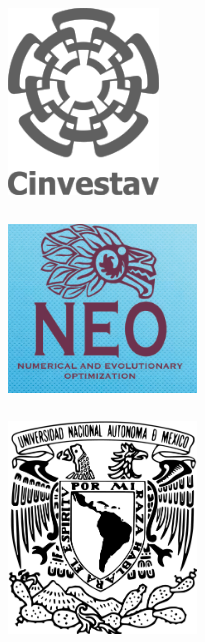 \documentclass[a0,portrait]{a0poster}
\begin{document}
\begin{mdframed}[style=MyFrame]

\begin{minipage}[b]{0.33\linewidth}
\raggedright
\includegraphics[width=4cm,valign=t]{Cinvestav-seal.pdf}
\end{minipage}
%
\begin{minipage}[b]{0.33\linewidth}
\centering
\includegraphics[width=5cm,height=5cm,valign=t]{neo_logo.png}
\end{minipage}
% 
\begin{minipage}[b]{0.33\linewidth}
\raggedleft
\includegraphics[width=5cm,valign=t]{Escudo-UNAM-escalable.pdf}
\end{minipage}\\


\end{mdframed}
\end{document}
